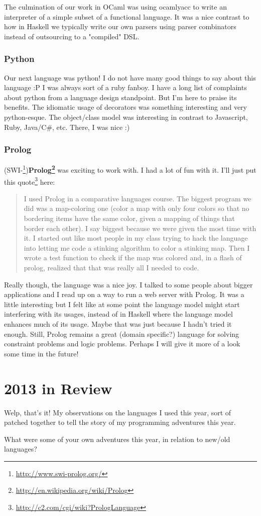 \documentclass[]{article}
\renewcommand{\href}[2]{#2\footnote{\url{#1}}}
\begin{document}
The culmination of our work in OCaml was using ocamlyacc to write an interpreter
of a simple subset of a functional language. It was a nice contrast to how in
Haskell we typically write our own parsers using parser combinators instead of
outsourcing to a "compiled" DSL.

\subsubsection{Python}

Our next language was python! I do not have many good things to say about this
language :P I was always sort of a ruby fanboy. I have a long list of complaints
about python from a language design standpoint. But I'm here to praise its
benefits. The idiomatic usage of decorators was something interesting and very
python-esque. The object/class model was interesting in contrast to Javascript,
Ruby, Java/C\#, etc. There, I was nice :)

\subsubsection{Prolog}

(\href{http://www.swi-prolog.org/}{SWI-})\textbf{\href{http://en.wikipedia.org/wiki/Prolog}{Prolog}}
was exciting to work with. I had a lot of fun with it. I'll just put
\href{http://c2.com/cgi/wiki?PrologLanguage}{this quote} here:

\begin{quote}
I used Prolog in a comparative languages course. The biggest program we did was
a map-coloring one (color a map with only four colors so that no bordering items
have the same color, given a mapping of things that border each other). I say
biggest because we were given the most time with it. I started out like most
people in my class trying to hack the language into letting me code a stinking
algorithm to color a stinking map. Then I wrote a test function to check if the
map was colored and, in a flash of prolog, realized that that was really all I
needed to code.
\end{quote}

Really though, the language was a nice joy. I talked to some people about bigger
applications and I read up on a way to run a web server with Prolog. It was a
little interesting but I felt like at some point the language model might start
interfering with its usages, instead of in Haskell where the language model
enhances much of its usage. Maybe that was just because I hadn't tried it
enough. Still, Prolog remains a great (domain specific?) language for solving
constraint problems and logic problems. Perhaps I will give it more of a look
some time in the future!

\section{2013 in Review}

Welp, that's it! My observations on the languages I used this year, sort of
patched together to tell the story of my programming adventures this year.

What were some of your own adventures this year, in relation to new/old
languages?
\end{document}
